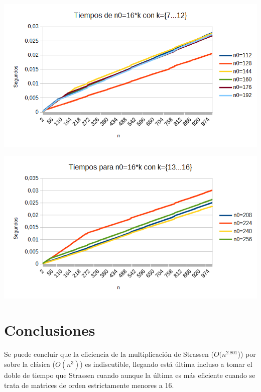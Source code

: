 \documentclass[12pt,letterpaper]{scrartcl}
\begin{document}
\includegraphics[scale=0.6]{7-12.png} 

\includegraphics[scale=0.6]{13-16.png} 
\newpage
\section{Conclusiones}

Se puede concluir que la eficiencia de la multiplicación de Strassen ($O(n^{2.801}$)) por sobre la clásica ($O(n^{3})$) es indiscutible, llegando está última incluso a tomar el doble de tiempo que Strassen cuando aunque la última es más eficiente cuando se trata de matrices de orden estrictamente menores a 16.
\end{document}
